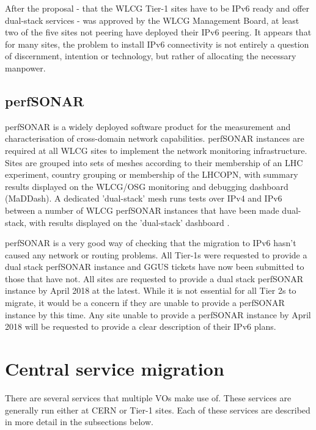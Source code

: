 \documentclass[a4paper]{jpconf}
\begin{document}
After the proposal - that the WLCG Tier-1 sites have to be IPv6 ready and offer dual-stack services -
was approved by the WLCG Management Board, at least two of the five sites not peering have deployed
their IPv6 peering.  It appears that for many sites, the problem to install IPv6 connectivity is not entirely a question of discernment,
intention or technology, but rather of allocating the necessary manpower.

\subsection{perfSONAR}
perfSONAR is a widely deployed software product for the measurement and characterisation of cross-domain network capabilities. perfSONAR instances are required at all WLCG sites to implement the network monitoring infrastructure. Sites are grouped into sets of meshes according to their membership of an LHC experiment, country grouping or membership of the LHCOPN, with summary results displayed on the WLCG/OSG monitoring and debugging dashboard (MaDDash). A dedicated 'dual-stack' mesh runs tests over IPv4 and IPv6 between a number of WLCG perfSONAR instances that have been made dual-stack, with results displayed on the 'dual-stack' dashboard \cite{perfSONAR}. 

perfSONAR is a very good way of checking that the migration to IPv6 hasn't caused any network or routing problems. All Tier-1s were requested to provide a dual stack perfSONAR instance and GGUS tickets have now been submitted to those that have not. All sites are requested to provide a dual stack perfSONAR instance by April 2018 at the latest. While it is not essential for all Tier 2s to migrate, it would be 
a concern if they are unable to provide a perfSONAR instance by this time. Any site unable to provide a perfSONAR instance by April 2018 will be requested to provide a clear description of their IPv6 plans.


\section{Central service migration}
There are several services that multiple VOs make use of.  These services are generally run either at CERN or Tier-1 sites.   Each of these services are described in more detail in the subsections below.
\end{document}
